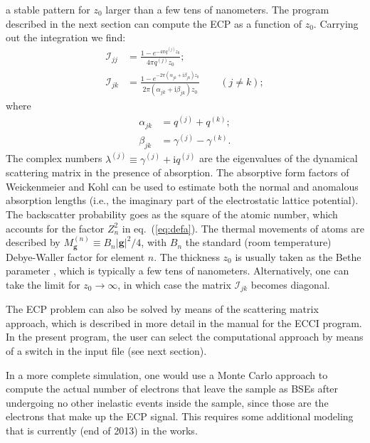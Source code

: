 \documentclass[DIV=calc, paper=letter, fontsize=11pt]{scrartcl}	 %
\begin{document}
a stable pattern for $z_0$ larger than a few tens of nanometers.  The program described in the next section can compute the ECP
as a function of $z_0$.  Carrying out the integration we find:
\begin{subequations}
\begin{align}
    \mathcal{I}_{jj} &= \frac{1-e^{-4\pi q^{(j)}z_{0}}}{4\pi 
    q^{(j)}z_{0}};\label{eq:a2a}\\
    \mathcal{I}_{jk} &= 
    \frac{1-e^{-2\pi(\alpha_{jk}+\mathrm{i}\beta_{jk})z_{0}}} 
    {2\pi(\alpha_{jk}+\mathrm{i}\beta_{jk})z_{0}}\qquad (j\ne k);
    \label{eq:a2b}
\end{align}
\end{subequations}
where
\begin{subequations}
\begin{align}
    \alpha_{jk} &= q^{(j)}+q^{(k)};\\
    \beta_{jk} &= \gamma^{(j)}-\gamma^{(k)}.
\end{align}
\end{subequations}
The complex numbers $\lambda^{(j)}\equiv\gamma^{(j)}+\mathrm{i}q^{(j)}$ are the eigenvalues of the dynamical scattering matrix in the 
presence of absorption.  The absorptive form factors of Weickenmeier and Kohl \parencite{weickenmeier1991a} can be used to estimate 
both the normal and anomalous absorption lengths (i.e., the imaginary part of the electrostatic lattice potential).   The backscatter probability goes as the square
of the atomic number, which accounts for the factor $Z_n^2$ in eq.~(\ref{eq:defa}). The thermal movements of 
atoms are described by $M^{(n)}_{\mathbf{g}}\equiv B_{n}\vert\mathbf{g}\vert^2/4$, with $B_n$ the standard (room temperature)
Debye-Waller factor for element $n$.  The thickness $z_0$ is usually taken as the Bethe parameter \parencite{reimer1985a}, which is typically a few tens of nanometers.  Alternatively,
one can take the limit for $z_0\rightarrow\infty$, in which case the matrix $\mathcal{I}_{jk}$ becomes diagonal.

The ECP problem can also be solved by means of the scattering matrix approach, which is described in more
detail in the manual for the ECCI program.  In the present program, the user can select the computational 
approach by means of a switch in the input file (see next section).

In a more complete simulation, one would use a Monte Carlo approach to compute the actual number of electrons that leave
the sample as BSEs after undergoing no other inelastic events inside the sample, since those are the electrons that make 
up the ECP signal.  This requires some additional modeling that is currently (end of 2013) in the works.
\end{document}
